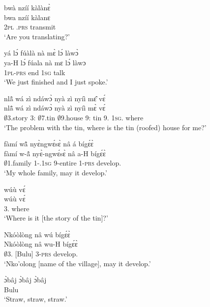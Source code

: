 \begin{exe}[(C234)] 
\exC\label{22}
  \glll     bwà nzíí kàlànɛ̀ \\
            bwa nzíí kàlanɛ \\
              2\textsc{pl} {\PROG}.\textsc{prs} transmit \\
    \trans `Are you translating?'
 
\exC\label{23}
  \glll     yá lɔ́ fúàlà nà mɛ̀ lɔ́ làwɔ̀ \\
           ya-H lɔ́ fúala nà mɛ lɔ́ làwɔ \\
              1\textsc{pl}-\textsc{prs} {\RETRO}  end {\CONJ} 1\textsc{sg} {\RETRO}  talk \\
    \trans `We just finished and I just spoke.'
 
\exC\label{24}
  \glll     nlã̂ wá zì ndáwɔ̀ nyà zì nyíì mɛ̂ vɛ́ \\
          nlã̂ wá zì ndáwɔ̀ nyà zì nyíì mɛ̀ vɛ́ \\
              $\emptyset$3.story 3:{\ATT}  $\emptyset$7.tin $\emptyset$9.house 9:{\ATT}  tin 9.{\COP} 1\textsc{sg}.{\OBJ} where \\
    \trans `The problem with the tin, where is the tin (roofed) house for me?'
 
\exC\label{25}
  \glll     fàmí wã̂ nyɛ̀ngwɛ́sɛ̀ nâ á bígɛ́ɛ̀ \\
           fàmí w-ã̂ nyɛ̀-ngwɛ́sɛ̀ nâ a-H bígɛ́ɛ̀ \\
              $\emptyset$1.family 1-{\POSS}.1\textsc{sg} 9-entire {\COMP} 1-\textsc{prs} develop.{\SBJV}  \\
    \trans `My whole family, may it develop.'
 
\exC\label{26}
  \glll     wúù vɛ́ \\
         wúù vɛ́ \\
              3.{\COP} where \\
    \trans `Where is it [the story of the tin]?'
 
\exC\label{27}
  \glll     Nkóòlòng nâ wú bígɛ́ɛ̀ \\
        Nkóòlòng nâ wu-H bígɛ́ɛ̀ \\
              $\emptyset$3.{\PN} [Bulu] {\COMP} 3-\textsc{prs} develop.{\SBJV}  \\
    \trans `Nko'olong [name of the village], may it develop.'
 
\exC\label{28}
  \gll   ɔ̀bâj ɔ̀bâj ɔ̀bâj \\
              [straw straw straw]Bulu \\
    \trans `Straw, straw, straw.'
 

\end{exe}
